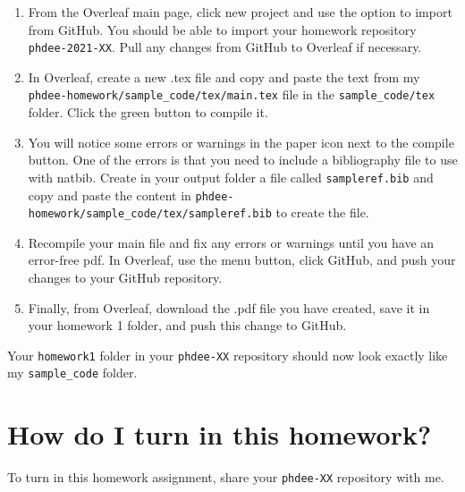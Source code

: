 \documentclass{article}
\begin{document}
\begin{enumerate}
    \item From the Overleaf main page, click new project and use the option to import from GitHub.  You should be able to import your homework repository \verb!phdee-2021-XX!.  Pull any changes from GitHub to Overleaf if necessary.
    \item In Overleaf, create a new .tex file and copy and paste the text from my \verb!phdee-homework/sample_code/tex/main.tex! file in the \verb!sample_code/tex! folder.  Click the green button to compile it.
    \item You will notice some errors or warnings in the paper icon next to the compile button.  One of the errors is that you need to include a bibliography file to use with natbib. Create in your output folder a file called \verb!sampleref.bib! and copy and paste the content in \verb!phdee-homework/sample_code/tex/sampleref.bib! to create the file.
    \item Recompile your main file and fix any errors or warnings until you have an error-free pdf.  In Overleaf, use the menu button, click GitHub, and push your changes to your GitHub repository.
    \item Finally, from Overleaf, download the .pdf file you have created, save it in your homework 1 folder, and push this change to GitHub.
\end{enumerate}
Your \verb!homework1! folder in your \verb!phdee-XX! repository should now look exactly like my \verb!sample_code! folder.

\section*{How do I turn in this homework?}

\noindent To turn in this homework assignment, share your \verb!phdee-XX! repository with me.
\end{document}
